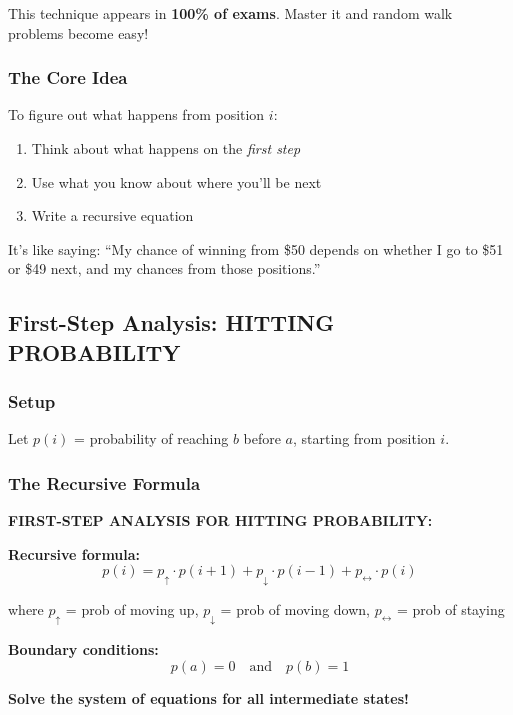 \documentclass[10pt,letterpaper]{article}
\begin{document}
\begin{criticalbox}
This technique appears in \textbf{100\% of exams}. Master it and random walk problems become easy!
\end{criticalbox}

\subsubsection{The Core Idea}

To figure out what happens from position $i$:
\begin{enumerate}
  \item Think about what happens on the \textit{first step}
  \item Use what you know about where you'll be next
  \item Write a recursive equation
\end{enumerate}

It's like saying: ``My chance of winning from \$50 depends on whether I go to \$51 or \$49 next, and my chances from those positions.''

\subsection{First-Step Analysis: HITTING PROBABILITY}

\subsubsection{Setup}

Let $p(i)$ = probability of reaching $b$ before $a$, starting from position $i$.

\subsubsection{The Recursive Formula}

\begin{formulabox}[colback=yellow!20,colframe=orange!80]
\textbf{FIRST-STEP ANALYSIS FOR HITTING PROBABILITY:}

\vspace{0.2cm}

\textbf{Recursive formula:}
\[
\boxed{p(i) = p_{\uparrow} \cdot p(i+1) + p_{\downarrow} \cdot p(i-1) + p_{\leftrightarrow} \cdot p(i)}
\]

where $p_{\uparrow}$ = prob of moving up, $p_{\downarrow}$ = prob of moving down, $p_{\leftrightarrow}$ = prob of staying

\vspace{0.2cm}

\textbf{Boundary conditions:}
\[
\boxed{p(a) = 0 \quad \text{and} \quad p(b) = 1}
\]

\textbf{Solve the system of equations for all intermediate states!}
\end{formulabox}
\end{document}
